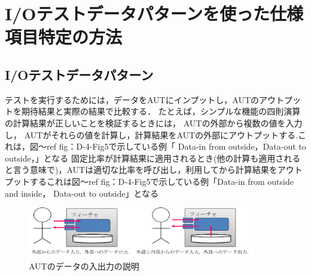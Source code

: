 \documentclass[a4paper,12pt]{jreport}
\begin{document}
\section{I/Oテストデータパターンを使った仕様項目特定の方法}

\subsection{I/Oテストデータパターン}

テストを実行するためには，データをAUTにインプットし，AUTのアウトプットを期待結果と実際の結果で比較する．
たとえば，シンプルな機能の四則演算の計算結果が正しいことを検証するときには， AUTの外部から複数の値を入力し， AUTがそれらの値を計算し，計算結果をAUTの外部にアウトプットする.これは，図〜ref {fig：D-4-Fig5}で示している例「 Data-in from outside，Data-out to outside，」となる
固定比率が計算結果に適用されるとき(他の計算も適用されると言う意味で)，AUTは適切な比率を呼び出し，利用してから計算結果をアウトプットするこれは図〜ref {fig：D-4-Fig5}で示している例「Data-in from outside and inside， Data-out to outside」となる
 \begin{figure}[htbp]
  \begin{center}
  \includegraphics[width=10cm]{./image/D-3-Fig4.png}
  \caption{AUTのデータの入出力の説明}
  \label{fig:D-4-Fig5}
  \end{center}
   \end{figure}


\end{document}
